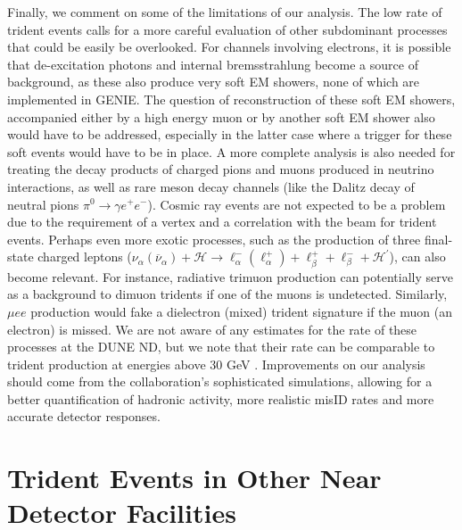 Finally, we comment on some of the limitations of our analysis. The low rate of trident events calls for a more careful evaluation of other subdominant processes that could be easily be overlooked. For channels involving electrons, it is possible that de-excitation photons and internal bremsstrahlung become a source of background, as these also produce very soft EM showers, none of which are implemented in GENIE. The question of reconstruction of these soft EM showers, accompanied either by a high energy muon or by another soft EM shower also would have to be addressed, especially in the latter case where a trigger for these soft events would have to be in place. A more complete analysis is also needed for treating the decay products of charged pions and muons produced in neutrino interactions, as well as rare meson decay channels (like the Dalitz decay of neutral pions $\pi^0 \to \gamma e^+ e^-$). Cosmic ray events are not expected to be a problem due to the requirement of a vertex and a correlation with the beam for trident events. Perhaps even more exotic processes, such as the production of three final-state charged leptons ($\nu_{\alpha} (\overline{\nu}_{\alpha}) + \mathcal{H} \to  \ell_\alpha^- (\ell_\alpha^+) + \ell_\beta^+ + \ell_{\beta}^- + \mathcal{H^\prime}$), can also become relevant. For instance, radiative trimuon production \cite{Smith:1977nx} can potentially serve as a background to dimuon tridents if one of the muons is undetected. Similarly, $\mu e e$ production would fake a dielectron (mixed) trident signature if the muon (an electron) is missed. We are not aware of any estimates for the rate of these processes at the DUNE ND, but we note that their rate can be comparable to trident production at energies above $30$ GeV \cite{Albright:1978mg}. Improvements on our analysis should come from the collaboration's sophisticated simulations, allowing for a better quantification of hadronic activity, more realistic misID rates and more accurate detector responses.  

\section{Trident Events in Other Near Detector Facilities}

